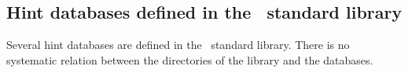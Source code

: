 


\subsection{Hint databases defined in the \Coq\ standard library}

Several hint databases are defined in the \Coq\ standard
library. There is no systematic relation between the directories of the
library and the databases.

